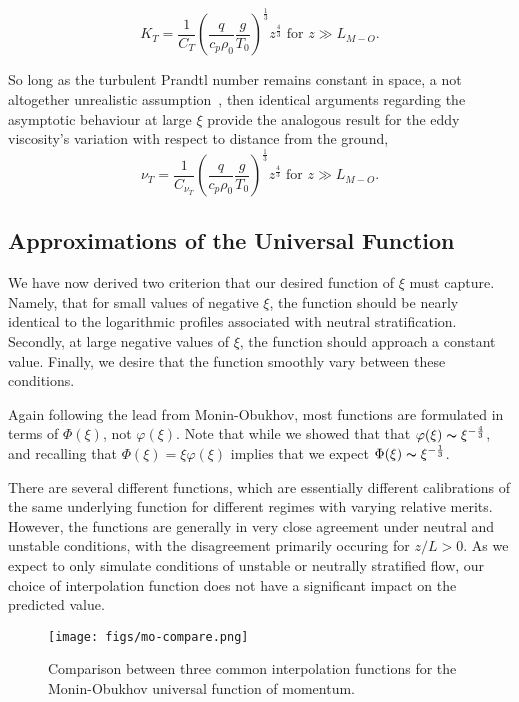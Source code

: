 \begin{equation}
 K_T = \frac{1}{C_T} \left( \frac{q}{c_p \rho_0} \frac{g}{T_0}
		     \right)^\frac{1}{3} z^{\frac{4}{3}}  \text{ 
for } z \gg L_{M-O}. 
\end{equation}

So long as the turbulent Prandtl number remains constant in space, a not
altogether unrealistic assumption~\cite{chuang1969turbulent}, then
identical arguments regarding the asymptotic behaviour at large $\xi$
provide the analogous result for the eddy viscosity's variation with
respect to distance from the ground,   
\begin{equation}
 \nu_T = \frac{1}{C_{\nu_T}} \left( \frac{q}{c_p \rho_0} \frac{g}{T_0}
			     \right)^\frac{1}{3} z^{\frac{4}{3}}  \text{ 
for } z \gg L_{M-O}. 
\end{equation}


\subsection*{Approximations of the Universal Function}

We have now derived two criterion that our desired function of $\xi$ 
must capture. Namely, that for small values of negative $\xi$, the
function should be nearly identical to the logarithmic profiles
associated with neutral stratification. Secondly, at large negative
values of $\xi$, the function should approach a constant value. Finally,
we desire that the function smoothly vary between these conditions. 

Again following the lead from Monin-Obukhov, most functions are
formulated in terms of $\Phi(\xi)$, not $\varphi(\xi)$. Note that while
we showed that that $\varphi(\xi) \thicksim \xi^{-\frac{4}{3}}$, and
recalling that $\Phi(\xi) = \xi \varphi(\xi)$ implies that we expect
$\Phi(\xi) \thicksim \xi^{-\frac{1}{3}}$.

There are several different functions, which are essentially different
calibrations of the same underlying function for different regimes with 
varying relative merits\cite{?}. However, the
functions are generally in 
very close agreement under neutral and unstable conditions, with the
disagreement primarily occuring for $z/L>0$. As we expect to only
simulate conditions  of unstable or neutrally stratified flow, our
choice of interpolation function does not have a significant impact on 
the predicted value.  

\begin{figure}[p]
  \texttt{[image: figs/mo-compare.png]}\\
  \label{fig:interp-mo}
  \caption{Comparison between three common interpolation functions for
 the Monin-Obukhov universal function of momentum.} 
\end{figure}

